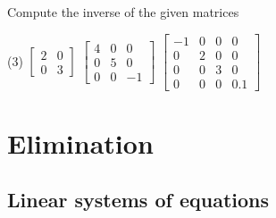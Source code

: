 \begin{exercise}
Compute the inverse of the given matrices
\begin{tasks}(3)
\task
$\begin{bmatrix}
2 & 0 \\
0 & 3 
\end{bmatrix}$
\task
$\begin{bmatrix}
4 & 0 & 0 \\
0 & 5 & 0 \\ 
0 & 0 & -1
\end{bmatrix}$
\task
$\begin{bmatrix}
-1 & 0 & 0 & 0 \\
0 & 2 & 0 & 0 \\ 
0 & 0 & 3 & 0 \\
0 & 0 & 0 & 0.1
\end{bmatrix}$
\end{tasks}
\end{exercise}




\sectionnewpage
\section{Elimination}
\label{elim:section}


\subsection{Linear systems of equations}

